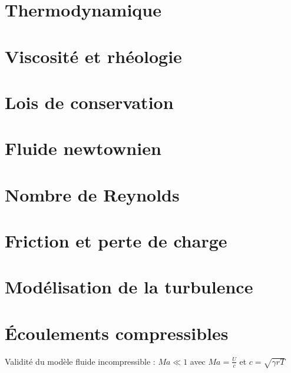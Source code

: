 \documentclass[10pt,a4paper,twocolumn,fleqn]{article}
\begin{document}
\section{Thermodynamique}


\section{Viscosité et rhéologie}\label{sec:rheo}


\section{Lois de conservation}


\section{Fluide newtownien}


\section{Nombre de Reynolds} %


\section{Friction et perte de charge} %


\section{Modélisation de la turbulence}


\section{Écoulements compressibles}

Validité du modèle fluide incompressible : $Ma \ll 1$
avec $Ma=\frac{U}{c}$ et $c=\sqrt{\gamma r T}$
\end{document}

